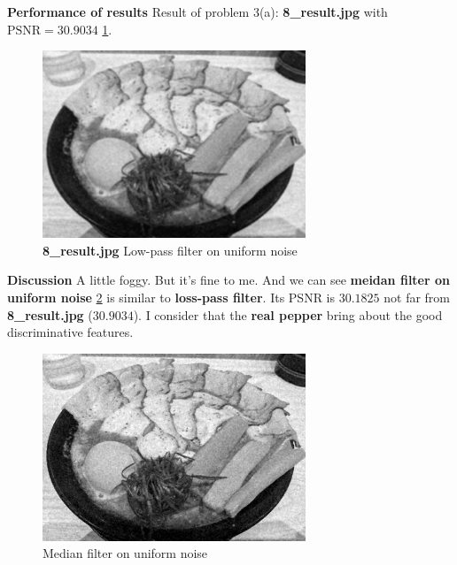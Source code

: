\textbf{Performance of results}
Result of problem 3(a): \textbf{8\_result.jpg} with $\mbox{PSNR}=30.9034$ \cref{fig3a_1}.
\begin{figure}
    \centering
    \includegraphics[width=0.7\textwidth]{image/8_result.jpg}
    \caption{\textbf{8\_result.jpg} Low-pass filter on uniform noise}
    \label{fig3a_1}
\end{figure}

\textbf{Discussion}
A little foggy. But it's fine to me.
And we can see \textbf{meidan filter on uniform noise} \cref{fig3a_1m} is similar to \textbf{loss-pass filter}. Its PSNR is $30.1825$ not far from \textbf{8\_result.jpg} ($30.9034$). I consider that the \textbf{real pepper} bring about the good discriminative features.
\begin{figure}
  \centering
  \includegraphics[width=0.7\textwidth]{image/tmp/8_result_median.jpg}
  \caption{Median filter on uniform noise}
  \label{fig3a_1m}
\end{figure}

